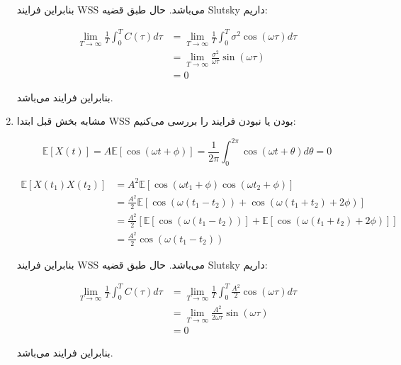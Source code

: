 \begin{enumerate}
	بنابراین فرایند WSS می‌باشد. حال طبق قضیه Slutsky داریم:
	
	$$
	\begin{aligned}
		\mathop {\lim }\limits_{T \to \infty } \frac{1}{T}\int_0^T {C\left( \tau  \right)d\tau }  & = \mathop {\lim }\limits_{T \to \infty } \frac{1}{T}\int_0^T {{\sigma ^2}\cos \left( {\omega \tau } \right)d\tau } \\
		& = \mathop {\lim }\limits_{T \to \infty } \frac{{{\sigma ^2}}}{{\omega \tau }}\sin \left( {\omega \tau } \right)\\
		& = 0
	\end{aligned}
	$$
	
	بنابراین فرایند
	می‌باشد.
	
	\item
	مشابه بخش قبل ابتدا WSS بودن یا نبودن فرایند را بررسی می‌کنیم:
	
	$$
	\mathbb{E}\left[ {X\left( t \right)} \right] = A\mathbb{E}\left[ {\cos \left( {\omega t + \phi } \right)} \right] = \frac{1}{{2\pi }}\int_0^{2\pi } {\cos \left( {\omega t + \theta } \right)d\theta }  = 0
	$$
	
	$$
	\begin{aligned}
		\mathbb{E}\left[ {X\left( {{t_1}} \right)X\left( {{t_2}} \right)} \right] & = {A^2}\mathbb{E}\left[ {\cos \left( {\omega {t_1} + \phi } \right)\cos \left( {\omega {t_2} + \phi } \right)} \right]\\
		& = \frac{{{A^2}}}{2}\mathbb{E}\left[ {\cos \left( {\omega \left( {{t_1} - {t_2}} \right)} \right) + \cos \left( {\omega \left( {{t_1} + {t_2}} \right) + 2\phi } \right)} \right]\\
		& = \frac{{{A^2}}}{2}\left[ {\mathbb{E}\left[ {\cos \left( {\omega \left( {{t_1} - {t_2}} \right)} \right)} \right] + \mathbb{E}\left[ {\cos \left( {\omega \left( {{t_1} + {t_2}} \right) + 2\phi } \right)} \right]} \right]\\
		& = \frac{{{A^2}}}{2}\cos \left( {\omega \left( {{t_1} - {t_2}} \right)} \right)
	\end{aligned}
	$$
	
	بنابراین فرایند WSS می‌باشد. حال طبق قضیه Slutsky داریم:
	
	$$
	\begin{aligned}
		\mathop {\lim }\limits_{T \to \infty } \frac{1}{T}\int_0^T {C\left( \tau  \right)d\tau }  & = \mathop {\lim }\limits_{T \to \infty } \frac{1}{T}\int_0^T {\frac{{{A^2}}}{2}\cos \left( {\omega \tau } \right)d\tau } \\
		& = \mathop {\lim }\limits_{T \to \infty } \frac{{{A^2}}}{{2\omega \tau }}\sin \left( {\omega \tau } \right)\\
		& = 0
	\end{aligned}
	$$
	
	بنابراین فرایند
	می‌باشد.
	
	
\end{enumerate}
